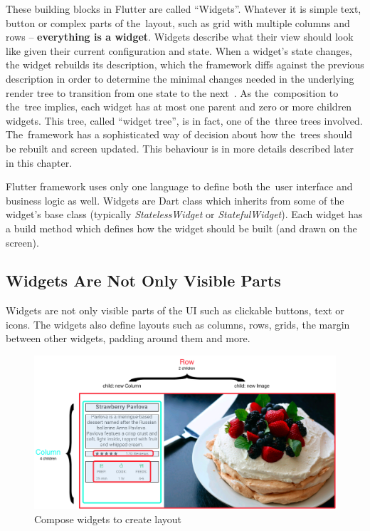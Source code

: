 These building blocks in Flutter are called ``Widgets''. Whatever it is simple text, button or complex parts of the~layout, such as grid with multiple columns and rows -- \textbf{everything is a widget}.  Widgets describe what their view should look like given their current configuration and state. When a widget's state changes, the widget rebuilds its description, which the framework diffs against the previous description in order to determine the minimal changes needed in the underlying render tree to transition from one state to the next~\cite{flutter-widget-intro}. As the~composition to the~tree implies, each widget has at most one parent and zero or more children widgets. This tree, called ``widget tree'', is in fact, one of the~three trees involved. The~framework has a sophisticated way of decision about how the~trees should be rebuilt and screen updated. This behaviour is in more details described later in this chapter.

Flutter framework uses only one language to define both the~user interface and business logic as well.  Widgets are Dart class which inherits from some of the widget's base class (typically \textit{StatelessWidget} or \textit{StatefulWidget}). Each widget has a build method which defines how the widget should be built (and drawn on the screen). 
\subsection{Widgets Are Not Only Visible Parts}
Widgets are not only visible parts of the UI such as clickable buttons, text or icons. The widgets also define layouts such as columns, rows, grids, the margin between other widgets, padding around them and more. 

\begin{figure}[htp]
    \centering
    \includegraphics[width=0.75\linewidth]{img/flutter/layout_compose.png}
    \caption{Compose widgets to create layout~\cite{flutter-widget-layout}}
    \label{fig:flutter-compose-widget}
\end{figure}

